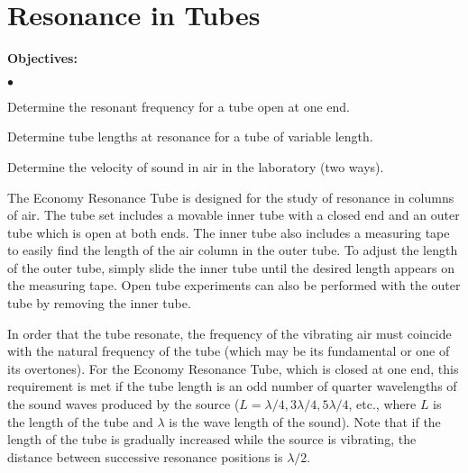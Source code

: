 
\section{Resonance in Tubes}

\makelabheader %



{\noindent \bf Objectives:} \begin{list}{$\bullet$}{\itemsep0pt }

\item Determine the resonant frequency for a tube open at one end.

\item Determine tube lengths at resonance for a tube of variable length.

\item Determine the velocity of sound in air in the laboratory (two ways).

\end{list}


The Economy Resonance Tube is designed for the study of resonance in columns of air.  The tube set includes a movable inner tube with a closed end and an outer tube which is open at both ends.  The inner tube also includes a measuring tape to easily find the length of the air column in the outer tube.  To adjust the length of the outer tube, simply slide the inner tube until the desired length appears on the measuring tape.  Open tube experiments can also be performed with the outer tube by removing the inner tube.

\noindent In order that the tube resonate, the frequency of the vibrating air must coincide with the natural frequency of the tube (which may be its fundamental or one of its overtones). For the Economy Resonance Tube, which is closed at one end, this requirement is met if the tube length is an odd number of quarter wavelengths of the sound waves produced by the source ($L = \lambda/4, 3 \lambda/4, 5 \lambda/4$, etc., where $L$ is the length of the tube and $\lambda$ is the wave length of the sound). Note that if the length of the tube is gradually increased while the source is vibrating, the distance between successive resonance positions is $\lambda/2$. \\

 \\


